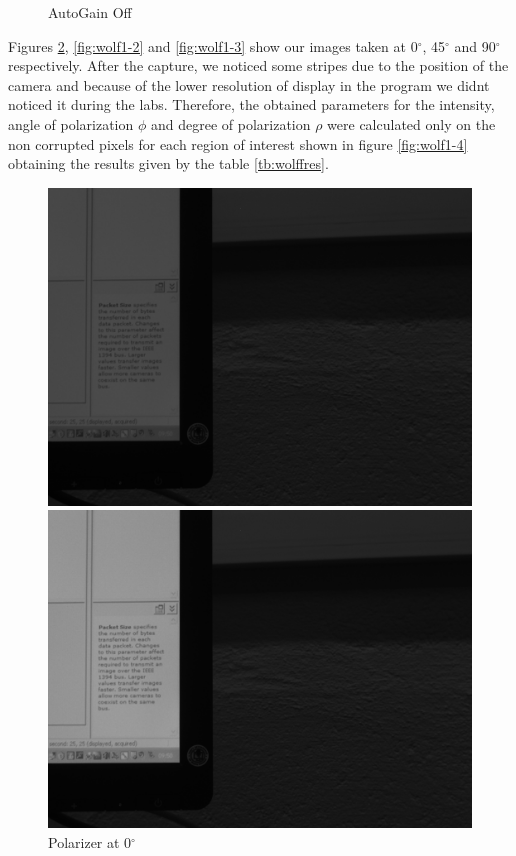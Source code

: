 \documentclass{article}
\begin{document}
\begin{figure}[ht]
\begin{minipage}[b]{0.3\linewidth}
  \caption{AutoGain Off}
  \label{fig:minipage2}
\end{minipage}
\end{figure}

Figures \ref{fig:wolf1-1}, \ref{fig:wolf1-2} and \ref{fig:wolf1-3} show our images
taken at 0$^\circ$, 45$^\circ$ and 90$^\circ$ respectively. After the capture, 
we noticed some stripes due to the position of the camera and because of the lower 
resolution of display in the program we didnt noticed it during 
the labs.  Therefore, the obtained parameters
for the intensity, angle of polarization $\phi$ 
and degree of polarization $\rho$ were calculated only on the non
corrupted pixels for each region of interest
 shown in figure \ref{fig:wolf1-4} 
obtaining the results given by the table \ref{tb:wolffres}.

\begin{figure}[H]
\centering
\begin{minipage}[b]{0.18\linewidth}
\includegraphics[width=1.0\textwidth,natwidth=100,natheight=100]{../wolff/results/im0.png}
  \caption{Polarizer at 0$^\circ$}
  \label{fig:wolf1-1}
\end{minipage}
\quad
\begin{minipage}[b]{0.18\linewidth}
\includegraphics[width=1.0\textwidth,natwidth=100,natheight=100]{../wolff/results/im45.png}

\end{minipage}
\end{figure}
\end{document}
